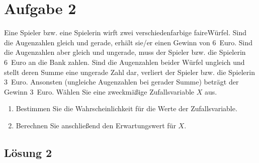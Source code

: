 \documentclass[main.tex]{subfiles}
\begin{document}
\section{Aufgabe 2}
Eine Spieler bzw. eine Spielerin wirft zwei verschiedenfarbige \glqq faire\grqq Würfel. Sind die Augenzahlen gleich und gerade, erhält sie/er einen Gewinn von 6~Euro. Sind die Augenzahlen aber gleich und ungerade, muss der Spieler bzw. die Spielerin 6~Euro an die Bank zahlen. Sind die Augenzahlen beider Würfel ungleich und stellt deren Summe eine ungerade Zahl dar, verliert der Spieler bzw. die Spielerin 3~Euro. Ansonsten (ungleiche Augenzahlen bei gerader Summe) beträgt der Gewinn 3~Euro. Wählen Sie eine zweckmäßige Zufallsvariable $X$ aus.
\begin{enumerate}
    \item Bestimmen Sie die Wahrscheinlichkeit für die Werte der Zufallsvariable.
    \item Berechnen Sie anschließend den Erwartungswert für $X$.
\end{enumerate}

\subsection{Lösung 2}
\end{document}
